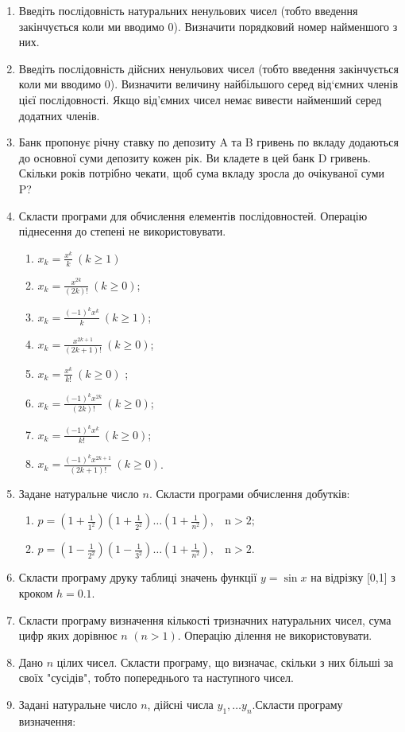 \documentclass[a5paper,titlepage,openany,twoside,
]
{book_unv}%
\makeatletter
\newcommand{\xslalph}[1]{\expandafter\@xslalph\csname c@#1\endcsname}
\newcommand{\@xslalph}[1]{%
    \ifcase#1\or а\or б\or в\or г\or д\or e\or є\or ж\or з\or i%
    \or й\or к\or л\or м\or н\or о\or п\or р\or с\or т%
    \or у\or ф\or х\or ц\or ч\or ш\or ю\or я\or аа\or бб\or вв%
    \else\@ctrerr\fi%
}
\makeatother
\begin{document}
\begin{enumerate}
\item
  Введіть послідовність натуральних ненульових чисел (тобто введення
  закінчується коли ми вводимо 0). Визначити порядковий номер найменшого
  з них.
\item
  Введіть послідовність дійсних ненульових чисел (тобто введення
  закінчується коли ми вводимо 0). Визначити величину найбільшого серед
  від`ємних членів цієї послідовності. Якщо від'ємних чисел немає
  вивести найменший серед додатних членів.
\item
  Банк пропонує річну ставку по депозиту A та B гривень по вкладу додаються
  до основної суми депозиту кожен рік. Ви кладете в цей банк D гривень.
  Скільки років потрібно чекати, щоб сума вкладу зросла до очікуваної
  суми P?
\item
  Скласти програми для обчислення елементів послідовностей. Операцію
  піднесення до степені не використовувати.
  \begin{multicols}{2}
\begin{enumerate}[label=\xslalph*)]
\item
\(x_{k} = \frac{x^{k}}{k}\ (k \geq 1)\) 
\item
\(x_{k} = \frac{x^{2k}}{(2k)!}\ (k \geq 0)\);
\item \(x_{k} = \frac{( - 1)^{k}x^{k}}{k}\ (k \geq 1)\); 
\item
\(x_{k} = \frac{x^{2k + 1}}{(2k + 1)!}\ (k \geq 0)\);
\item \(x_{k} = \frac{x^{k}}{k!}\ (k \geq 0)\) ;
\item \(x_{k} = \frac{(-1)^{k}x^{2k}}{(2k)!}\ (k \geq 0)\);
\item \(x_{k} = \frac{(-1)^{k}x^{k}}{k!}\ (k \geq 0)\); 
\item \(x_{k} = \frac{(-1)^{k}x^{2k + 1}}{(2k + 1)!}\ (k \geq  0)\).
 \end{enumerate}
  \end{multicols}
\item
  Задане натуральне число \(n\). Скласти програми обчислення добутків:
\begin{enumerate}[label=\xslalph*)]
\item
\(p = \left( 1 + \frac{1}{1^{2}} \right)\left( 1 + \frac{1}{2^{2}} \right)\ldots\left( 1 + \frac{1}{n^{2}} \right),\mathrm{\ \ \ \ n > 2};\)
\item
\(p = \left( 1 - \frac{1}{2^{2}} \right)\left( 1 - \frac{1}{3^{2}} \right)\ldots\left( 1 + \frac{1}{n^{2}} \right),\mathrm{\ \ \ \ n > 2.}\)
 \end{enumerate}
\item
  Скласти програму друку таблиці значень функції \(y = \sin x\) на
  відрізку {[}0,1{]} з кроком \(h = 0.1\).
\item
  Скласти програму визначення кількості тризначних натуральних чисел,
  сума цифр яких дорівнює \(n\) \((n > 1)\). Операцію ділення не
  використовувати.
\item
  Дано \(n\) цілих чисел. Скласти програму, що визначає, скільки з
  них більші за своїх "сусідів", тобто попереднього та наступного чисел.
\item
  Задані натуральне число $n$, дійсні числа
  \(y_{1},\ldots y_{n}.\)Скласти програму визначення:


\end{enumerate}
\end{document}
